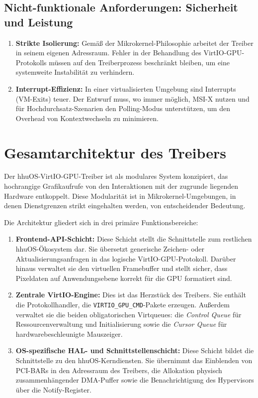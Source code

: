 \subsection{Nicht-funktionale Anforderungen: Sicherheit und Leistung}
\begin{enumerate}[label=\arabic*.]
    \item \textbf{Strikte Isolierung:} Gemäß der Mikrokernel-Philosophie \cite{Liedtke1995} arbeitet der Treiber in seinem eigenen Adressraum. Fehler in der Behandlung des VirtIO-GPU-Protokolls müssen auf den Treiberprozess beschränkt bleiben, um eine systemweite Instabilität zu verhindern.
    \item \textbf{Interrupt-Effizienz:} In einer virtualisierten Umgebung sind Interrupts (VM-Exits) teuer. Der Entwurf muss, wo immer möglich, MSI-X nutzen und für Hochdurchsatz-Szenarien den Polling-Modus unterstützen, um den Overhead von Kontextwechseln zu minimieren.
\end{enumerate}

\section{Gesamtarchitektur des Treibers}
Der hhuOS-VirtIO-GPU-Treiber ist als modulares System konzipiert, das
hochrangige Grafikaufrufe von den Interaktionen mit der zugrunde liegenden
Hardware entkoppelt. Diese Modularität ist in Mikrokernel-Umgebungen, in denen
Dienstgrenzen strikt eingehalten werden, von entscheidender Bedeutung.

Die Architektur gliedert sich in drei primäre Funktionsbereiche:
\begin{enumerate}
    \item \textbf{Frontend-API-Schicht:} Diese Schicht stellt die Schnittstelle zum restlichen hhuOS-Ökosystem dar. Sie übersetzt generische Zeichen- oder Aktualisierungsanfragen in das logische VirtIO-GPU-Protokoll. Darüber hinaus verwaltet sie den virtuellen Framebuffer und stellt sicher, dass Pixeldaten auf Anwendungsebene korrekt für die GPU formatiert sind.
    \item \textbf{Zentrale VirtIO-Engine:} Dies ist das Herzstück des Treibers. Sie enthält die Protokollhandler, die \texttt{VIRTIO\_GPU\_CMD}-Pakete erzeugen. Außerdem verwaltet sie die beiden obligatorischen Virtqueues: die \textit{Control Queue} für Ressourcenverwaltung und Initialisierung sowie die \textit{Cursor Queue} für hardwarebeschleunigte Mauszeiger.
    \item \textbf{OS-spezifische HAL- und Schnittstellenschicht:} Diese Schicht bildet die Schnittstelle zu den hhuOS-Kerndiensten. Sie übernimmt das Einblenden von PCI-BARs in den Adressraum des Treibers, die Allokation physisch zusammenhängender DMA-Puffer sowie die Benachrichtigung des Hypervisors über die Notify-Register.
\end{enumerate}


